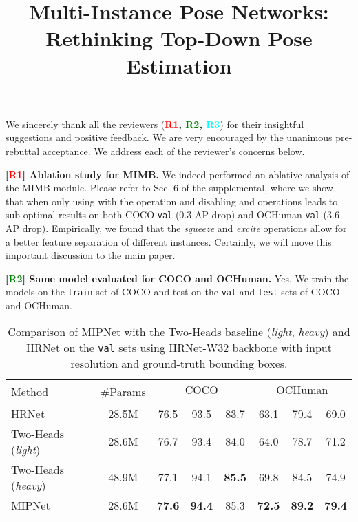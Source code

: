 \documentclass[10pt,twocolumn,letterpaper]{article}
\newcommand{\Rone}{\textcolor{red}{R1}}
\newcommand{\Rtwo}{\textcolor{green}{R2}}
\newcommand{\Rthree}{\textcolor{cyan}{R3}}
\begin{document}
\title{Multi-Instance Pose Networks: Rethinking Top-Down Pose Estimation}

\maketitle
\thispagestyle{empty}


\noindent
We sincerely thank all the reviewers (\textbf{\Rone, \Rtwo, \Rthree}) for their insightful suggestions and positive feedback. We are very encouraged by the unanimous pre-rebuttal acceptance. We address each of the reviewer's concerns below. 

\vspace{1.5mm}\noindent
\textbf{[\Rone] Ablation study for MIMB.} We indeed performed an ablative analysis of the MIMB module. Please refer to Sec. 6 of the supplemental, where we show that when only using  with the  operation and disabling  and  operations leads to sub-optimal results on both COCO \texttt{val} (0.3 AP drop) and OCHuman \texttt{val} (3.6 AP drop). Empirically, we found that the \textit{squeeze} and \textit{excite} operations allow for a better feature separation of different instances. Certainly, we will move this important discussion to the main paper.

\vspace{1.5mm}\noindent
\textbf{[\Rtwo] Same model evaluated for COCO and OCHuman.} Yes. We train the models on the \texttt{train} set of COCO and test on the \texttt{val} and \texttt{test} sets of COCO and OCHuman.

\begin{table}[b]
\centering
\captionsetup{font=small}
  \vspace*{-0.2in}
    \setlength{\tabcolsep}{1.9pt}
    \small
    \renewcommand{\arraystretch}{1.0} \begin{tabular}{@{}l|c|c c c|c c c@{}}
    \hline
   \multirow{2}{*}{Method} & \multirow{2}{*}{\#Params} & \multicolumn{3}{c|}{COCO} & \multicolumn{3}{c}{OCHuman}\\
    & &  &  &  &  &  &    \\
    \hline
    HRNet & 28.5M & 76.5 & 93.5 & 83.7 & 63.1 & 79.4 & 69.0 \\
    Two-Heads (\textit{light}) & 28.6M & 76.7 & 93.4 & 84.0 & 64.0 & 78.7 & 71.2 \\
    Two-Heads (\textit{heavy}) & 48.9M & 77.1 & 94.1 & \textbf{85.5} & 69.8 & 84.5 & 74.9 \\
    MIPNet & 28.6M & \textbf{77.6} & \textbf{94.4} & 85.3 & \textbf{72.5} & \textbf{89.2} & \textbf{79.4} \\
    \hline
    \end{tabular}

    \vspace*{-0.1in}
    \caption{Comparison of MIPNet with the Two-Heads baseline (\textit{light}, \textit{heavy}) and HRNet on the \texttt{val} sets using HRNet-W32 backbone with  input resolution and ground-truth bounding boxes.}
    \label{tab:two_head_baseline}
\end{table} 
\end{document}

